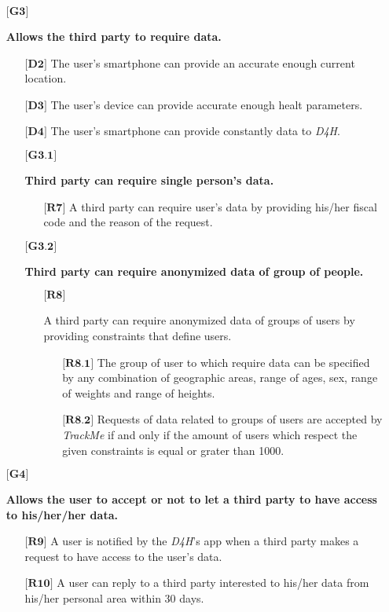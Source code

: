 \begin{itemize}
	\item[${\textbf{[G3]}}$] {\textbf{Allows the third party to require data.}
		\begin{itemize}
			\item[$\textbf{[D2]}$] {The user's smartphone can provide an accurate enough current location.}
			\item[$\textbf{[D3]}$] {The user's device can provide accurate enough healt parameters.}
			\item[$\textbf{[D4]}$] {The user's smartphone can provide constantly data to \hbox{\emph{D4H}}.}
			\item[${\textbf{[G3.1]}}$] {\textbf{Third party can require single person's data.}
				\begin{itemize}
					\item[$\textbf{[R7]}$] {A third party can require user's data by providing his/her fiscal code and the reason of the request.}
				\end{itemize}}
			\item[${\textbf{[G3.2]}}$] {\textbf{Third party can require anonymized data of group of people.}
				\begin{itemize}
					\item[$\textbf{[R8]}$] {A third party can require anonymized data of groups of users by providing constraints that define users.
						\begin{itemize}
							\item[$\textbf{[R8.1]}$] {The group of user to which require data can be specified by any combination of geographic areas, range of ages, 									sex, range of weights and range of heights.}
							\item[$\textbf{[R8.2]}$] {Requests of data related  to groups of users are accepted by \hbox{\emph{TrackMe}} if and only if the amount of 									users which respect the given constraints is equal or grater than 1000.}
						\end{itemize}}
				\end{itemize}}
		\end{itemize}}


	\item[${\textbf{[G4]}}$] {\textbf{Allows the user to accept or not to let a third party to have access to his/her/her data.}
		\begin{itemize}	
			\item[$\textbf{[R9]}$] {A user is notified by the \hbox{\emph{D4H}}'s app when a third party makes a request to have access to the user's data.}
			\item[$\textbf{[R10]}$] {A user can reply to a third party interested to his/her data from his/her personal area within 30 days.}
		\end{itemize}}



\end{itemize}
